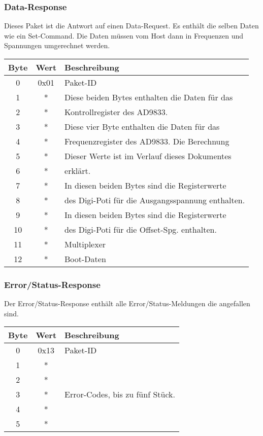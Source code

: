 \subsubsection*{Data-Response}
Dieses Paket ist die Antwort auf einen Data-Request. Es enthält die selben Daten wie ein Set-Command. Die Daten müssen vom Host dann in Frequenzen und Spannungen umgerechnet werden.
\begin{flushleft}
\begin{tabular}{c||c|l}
Byte & Wert & Beschreibung \\
\hline
\hline
0 & 0x01 & Paket-ID \\
\hline
1 & * & Diese beiden Bytes enthalten die Daten für das \\
2 & * & Kontrollregister des AD9833.\\
\hline
3 & * & Diese vier Byte enthalten die Daten für das \\
4 & * & Frequenzregister des AD9833. Die Berechnung \\
5 & * & Dieser Werte ist im Verlauf dieses Dokumentes \\
6 & * & erklärt.\\
\hline
7 & * & In diesen beiden Bytes sind die Registerwerte \\
8 & * & des Digi-Poti für die Ausgangsspannung enthalten.\\
\hline
9 & * & In diesen beiden Bytes sind die Registerwerte \\
10 & * & des Digi-Poti für die Offset-Spg. enthalten.\\
\hline
11 & * & Multiplexer\\
\hline
12 & * & Boot-Daten\\
\end{tabular}
\end{flushleft}

\subsubsection*{Error/Status-Response}
Der Error/Status-Response enthält alle Error/Status-Meldungen die angefallen sind.

\begin{flushleft}
\begin{tabular}{c||c|l}
Byte & Wert & Beschreibung \\
\hline
\hline
0 & 0x13 & Paket-ID \\
\hline
1 & * &  \\
2 & * &  \\
3 & * & Error-Codes, bis zu fünf Stück. \\
4 & * &  \\
5 & * &  \\
\end{tabular}
\end{flushleft}

